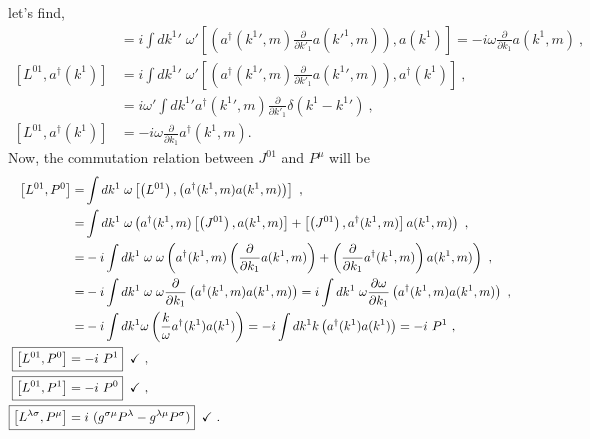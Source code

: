 \documentclass[12pt,a4paper]{report}
\begin{document}
let's find,
  \begin{align}
      [L^{01}, a(k^1)]&=i\int dk^1' \;\omega' \left[\left (a^{\dagger}(k^1',m)\frac{\partial}{\partial k'_1}a(k'^1,m)\right), a(k^1)\right]=-i\omega \frac{\partial}{\partial k_1}a(k^1,m)\nonumber~,\\
      [L^{01}, a^{\dagger}(k^1)]&=i\int dk^1' \;\omega' \left[\left (a^{\dagger}(k^1',m)\frac{\partial}{\partial k'_1}a(k^1',m)\right), a^{\dagger}(k^1)\right]\nonumber~,\\
      &=i\omega'\int dk^1' a^{\dagger}(k^1',m) \frac{\partial}{\partial k'_1}\delta(k^1-k^1')\nonumber~,\\
      [L^{01}, a^{\dagger}(k^1)]&=-i\omega \frac{\partial}{\partial k_1}a^{\dagger}(k^1,m).
  \end{align}
   Now, the commutation relation between $J^{01}$ and $P^\mu$ will be 
    \begin{align}
          \left[L^{01},P^0\right]=& \int dk^1 \; \omega\left[\left (L^{01}\right),\left (a^{\dagger}(k^1,m)a(k^1,m)\right)\right]\nonumber~,\\
          =&\int dk^1 \; \omega\left(a^{\dagger}(k^1,m)\left[\left (J^{01}\right),a(k^1,m)\right]+\left[\left (J^{01}\right),a^{\dagger}(k^1,m)\right]a(k^1,m)\right)\nonumber~,\\
          =&-i\int dk^1 \;\omega\; \omega\left(a^{\dagger}(k^1,m)\left(\frac{\partial}{\partial k_1}a(k^1,m)\right)+\left(\frac{\partial}{\partial k_1}a^{\dagger}(k^1,m)\right)a(k^1,m)\right)\nonumber~,\\
          =&-i\int dk^1 \;\omega\; \omega\frac{\partial}{\partial k_1}\left(a^{\dagger}(k^1,m)a(k^1,m)\right)=i\int dk^1 \; \omega\frac{\partial\omega}{\partial k_1}\left(a^{\dagger}(k^1,m)a(k^1,m)\right)\nonumber~,\\
          =&-i\int dk^1 \omega \left(\frac{k}{\omega}a^{\dagger}(k^1)a(k^1)\right)=-i\int dk^1 k \left(a^{\dagger}(k^1)a(k^1)\right)=-i~P^1\nonumber~,\\
          \Aboxed{\left[L^{01},P^0\right]=&-i~P^1}\;\;\checkmark\nonumber~,\\
          \Aboxed{\left[L^{01},P^1\right]=&-i~P^0}\;\;\checkmark\nonumber~,\\
          \Aboxed{\left[L^{\lambda\sigma},P^\mu\right]=&i~(g^{\sigma\mu}P^\lambda-g^{\lambda\mu}P^\sigma)}\;\;\checkmark~.
      \end{align}      
 \noindent{\rule{\textwidth}{1.5pt}}
 
 
\end{document}
